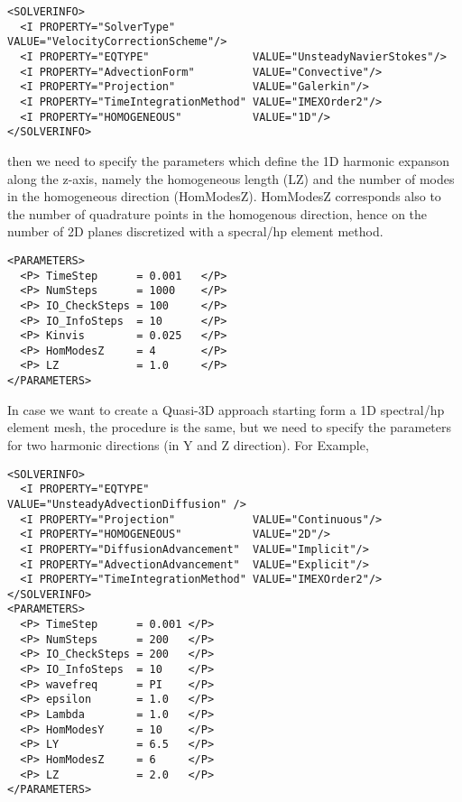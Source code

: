 \begin{lstlisting}[style=XMLStyle]
<SOLVERINFO>
  <I PROPERTY="SolverType"            VALUE="VelocityCorrectionScheme"/>
  <I PROPERTY="EQTYPE"                VALUE="UnsteadyNavierStokes"/>
  <I PROPERTY="AdvectionForm"         VALUE="Convective"/>
  <I PROPERTY="Projection"            VALUE="Galerkin"/>
  <I PROPERTY="TimeIntegrationMethod" VALUE="IMEXOrder2"/>
  <I PROPERTY="HOMOGENEOUS"           VALUE="1D"/>
</SOLVERINFO>
\end{lstlisting}

then we need to specify the parameters which define the 1D harmonic expanson
along the z-axis, namely the homogeneous length (LZ) and the number of modes in
the homogeneous direction (HomModesZ). HomModesZ corresponds also to the number
of quadrature points in the homogenous direction, hence on the number of 2D
planes discretized with a specral/hp element method.

\begin{lstlisting}[style=XMLStyle]
<PARAMETERS>
  <P> TimeStep      = 0.001   </P>
  <P> NumSteps      = 1000    </P>
  <P> IO_CheckSteps = 100     </P>
  <P> IO_InfoSteps  = 10      </P>
  <P> Kinvis        = 0.025   </P>
  <P> HomModesZ     = 4       </P>
  <P> LZ            = 1.0     </P>
</PARAMETERS>
\end{lstlisting}

In case we want to create a Quasi-3D approach starting form a 1D spectral/hp
element mesh, the procedure is the same, but we need to specify the parameters
for two harmonic directions (in Y and Z direction). For Example,

\begin{lstlisting}[style=XMLStyle]
<SOLVERINFO>
  <I PROPERTY="EQTYPE"                VALUE="UnsteadyAdvectionDiffusion" />
  <I PROPERTY="Projection"            VALUE="Continuous"/>
  <I PROPERTY="HOMOGENEOUS"           VALUE="2D"/>
  <I PROPERTY="DiffusionAdvancement"  VALUE="Implicit"/>
  <I PROPERTY="AdvectionAdvancement"  VALUE="Explicit"/>
  <I PROPERTY="TimeIntegrationMethod" VALUE="IMEXOrder2"/>
</SOLVERINFO>
<PARAMETERS>
  <P> TimeStep      = 0.001 </P>
  <P> NumSteps      = 200   </P>
  <P> IO_CheckSteps = 200   </P>
  <P> IO_InfoSteps  = 10    </P>
  <P> wavefreq      = PI    </P>
  <P> epsilon       = 1.0   </P>
  <P> Lambda        = 1.0   </P>
  <P> HomModesY     = 10    </P>
  <P> LY            = 6.5   </P>
  <P> HomModesZ     = 6     </P>
  <P> LZ            = 2.0   </P>
</PARAMETERS>
\end{lstlisting}

